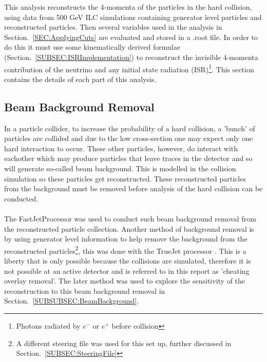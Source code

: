 This analysis reconstructs the 4-momenta of the particles in the hard collision, using data from 500 GeV ILC simulations containing generator level particles and reconstructed particles. Then several variables used in the analysis in Section.~\ref{SEC:ApplyingCuts} are evaluated and stored in a .root file. In order to do this it must use some kinematically derived formulae (Section.~\ref{SUBSEC:ISRImplementation}) to reconstruct the invisible 4-momenta contribution of the neutrino and any initial state radiation (ISR)\footnote{Photons radiated by ${e}^{-}$ or ${e}^{+}$ before collision}. This section contains the details of each part of this analysis.

\subsection{Beam Background Removal}
\label{SUBSEC:BeamBackgroundRemoval}
In a particle collider, to increase the probability of a hard collision, a 'bunch' \cite{Herr:941318} of particles are collided and due to the low cross-section one may expect only one hard interaction to occur. These other particles, however, do interact with eachother which may produce particles that leave traces in the detector and so will generate so-called beam background. This is modelled in the collision simulation so these particles get reconstructed. These reconstructed particles from the background must be removed before analysis of the hard collision can be conducted.
\\\\
The FastJetProcessor \cite{Cacciari:2011ma} was used to conduct such beam background removal from the reconstructed particle collection. Another method of background removal is by using generator level information to help remove the background from the reconstructed particles\footnote{A different steering file was used for this set up, further discussed in Section.~\ref{SUBSEC:SteeringFile}}, this was done with the TrueJet processor \cite{MikaelBerggen2018}. This is a liberty that is only possible because the collisions are simulated, therefore it is not possible at an active detector and is referred to in this report as 'cheating overlay removal'. The later method was used to explore the sensitivity of the reconstruction to this beam background removal in Section.~\ref{SUBSUBSEC:BeamBackground}.

